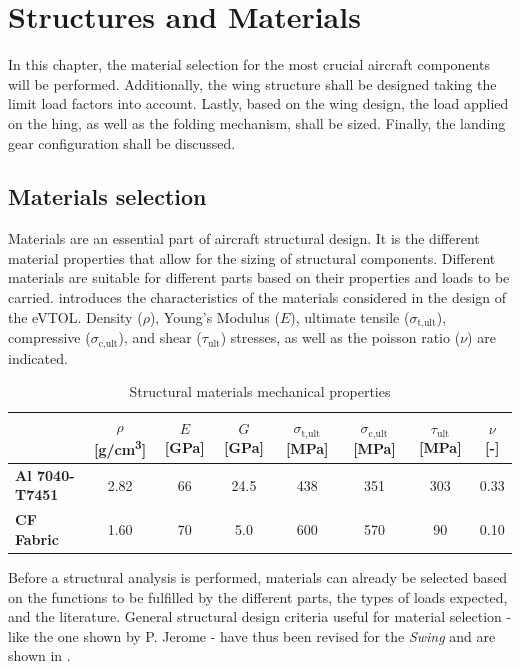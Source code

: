 \chapter{Structures and Materials}
\label{ch:Structures_and_Materials}
In this chapter, the material selection for the most crucial aircraft components will be performed.
Additionally, the wing structure shall be designed taking the limit load factors into account.
Lastly, based on the wing design, the load applied on the hing, as well as the folding mechanism, shall be sized.
Finally, the landing gear configuration shall be discussed.
\section{Materials selection}
\label{sec:matselection}
Materials are an essential part of aircraft structural design.
It is the different material properties that allow for the sizing of structural components.
Different materials are suitable for different parts based on their properties and loads to be carried.  introduces the characteristics of the materials considered in the design of the eVTOL. Density ($\rho$), Young's Modulus ($E$), ultimate tensile ($\sigma_{\text{t,ult}}$), compressive ($\sigma_{\text{c,ult}}$), and shear ($\tau_{\text{ult}}$) stresses, as well as the poisson ratio ($\nu$) are indicated. 

\begin{table}[H]
    \caption{Structural materials mechanical properties}
    \label{tab:matproperties}
    \centering
        \begin{tabular}{l|SSSSSSS}
            \toprule
            & \textbf{$\rho$ [\unit{g/cm^3}]} & \textbf{$E$ [\unit{GPa}]} & \textbf{$G$ [\unit{GPa}]} & \textbf{$\sigma_{\text{t,ult}}$ [\unit{MPa}]} & \textbf{$\sigma_{\text{c,ult}}$ [\unit{MPa}]} & \textbf{$\tau_{\text{ult}}$ [\unit{MPa}]} & \textbf{$\nu$ [\unit{-}]} \\ \midrule
            \textbf{Al 7040-T7451} \cite{Al7040} & 2.82 & 66 & 24.5 & 438 & 351 & 303 & 0.33 \\
            \textbf{CF Fabric} \cite{CFRP} & 1.60 & 70 & 5.0 & 600 & 570 & 90 & 0.10 \\ \bottomrule
        \end{tabular}
\end{table}

Before a structural analysis is performed, materials can already be selected based on the functions to be fulfilled by the different parts, the types of loads expected, and the literature.
General structural design criteria useful for material selection - like the one shown by P. Jerome \cite{jerome2001composite} - have thus been revised for the \textit{Swing} and are shown in .


